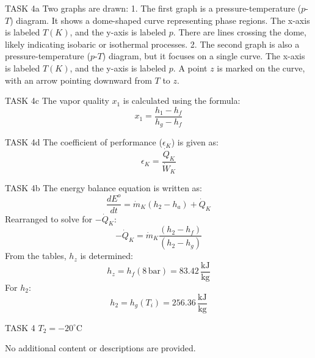 TASK 4a  
Two graphs are drawn:  
1. The first graph is a pressure-temperature (\(p\)-\(T\)) diagram. It shows a dome-shaped curve representing phase regions. The x-axis is labeled \(T(K)\), and the y-axis is labeled \(p\). There are lines crossing the dome, likely indicating isobaric or isothermal processes.  
2. The second graph is also a pressure-temperature (\(p\)-\(T\)) diagram, but it focuses on a single curve. The x-axis is labeled \(T(K)\), and the y-axis is labeled \(p\). A point \(z\) is marked on the curve, with an arrow pointing downward from \(T\) to \(z\).  

TASK 4c  
The vapor quality \(x_1\) is calculated using the formula:  
\[
x_1 = \frac{h_1 - h_f}{h_g - h_f}
\]  

TASK 4d  
The coefficient of performance (\(\epsilon_K\)) is given as:  
\[
\epsilon_K = \frac{\dot{Q}_K}{\dot{W}_K}
\]  

TASK 4b  
The energy balance equation is written as:  
\[
\frac{dE^{o}}{dt} = \dot{m}_K (h_2 - h_a) + \dot{Q}_K
\]  
Rearranged to solve for \(-\dot{Q}_K\):  
\[
-\dot{Q}_K = \dot{m}_K \frac{(h_2 - h_f)}{(h_2 - h_g)}
\]  
From the tables, \(h_z\) is determined:  
\[
h_z = h_f(8 \, \text{bar}) = 83.42 \, \frac{\text{kJ}}{\text{kg}}
\]  
For \(h_2\):  
\[
h_2 = h_g(T_i) = 256.36 \, \frac{\text{kJ}}{\text{kg}}
\]  

TASK 4  
\(T_2 = -20^\circ\text{C}\)  

No additional content or descriptions are provided.